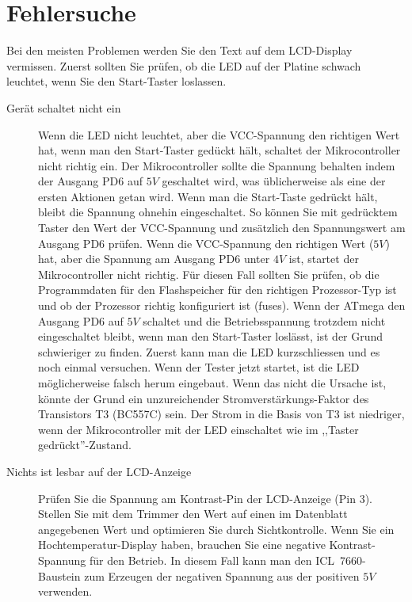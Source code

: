 \section{Fehlersuche}
Bei den meisten Problemen werden Sie den Text auf dem LCD-Display vermissen.
Zuerst sollten Sie prüfen, ob die LED auf der Platine schwach leuchtet, wenn Sie den Start-Taster
loslassen.
\begin{description}

\item[Gerät schaltet nicht ein]  
Wenn die LED nicht leuchtet, aber die VCC-Spannung den richtigen Wert hat, wenn
man den Start-Taster gedückt hält, schaltet der Mikrocontroller nicht richtig ein.
Der Mikrocontroller sollte die Spannung behalten indem der Ausgang PD6 auf \(5V\)
geschaltet wird, was üblicherweise als eine der ersten Aktionen getan wird.
Wenn man die Start-Taste gedrückt hält, bleibt die Spannung ohnehin eingeschaltet.
So können Sie mit gedrücktem Taster den Wert der VCC-Spannung und zusätzlich den Spannungswert am
Ausgang PD6 prüfen.
Wenn die VCC-Spannung den richtigen Wert (\(5V\)) hat, aber die Spannung am Ausgang
PD6 unter \(4V\) ist, startet der Mikrocontroller nicht richtig.
Für diesen Fall sollten Sie prüfen, ob die Programmdaten für den Flashspeicher
für den richtigen Prozessor-Typ ist und ob der Prozessor richtig konfiguriert ist (fuses).
Wenn der ATmega den Ausgang PD6 auf \(5V\) schaltet und die Betriebsspannung 
trotzdem nicht eingeschaltet bleibt, wenn man den Start-Taster loslässt, ist der
Grund schwieriger zu finden.
Zuerst kann man die LED kurzschliessen und es noch einmal versuchen.
Wenn der Tester jetzt startet, ist die LED möglicherweise falsch herum eingebaut.
Wenn das nicht die Ursache ist, könnte der Grund ein unzureichender Stromverstärkungs-Faktor
des Transistors T3 (BC557C) sein.
Der Strom in die Basis von T3 ist niedriger, wenn der Mikrocontroller mit der LED einschaltet
wie im ,,Taster gedrückt''-Zustand.

\item[Nichts ist lesbar auf der LCD-Anzeige] 
Prüfen Sie die Spannung am Kontrast-Pin der LCD-Anzeige (Pin 3).
Stellen Sie mit dem Trimmer den Wert auf einen im Datenblatt angegebenen Wert und optimieren Sie
durch Sichtkontrolle.
Wenn Sie ein Hochtemperatur-Display haben, brauchen Sie eine negative Kontrast-Spannung für
den Betrieb.
In diesem Fall kann man den ICL~7660-Baustein zum Erzeugen der negativen Spannung aus der
positiven \(5V\) verwenden.


\end{description}
